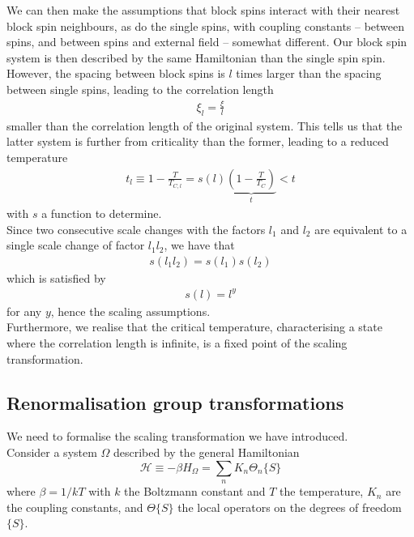 \documentclass[class=report, float=false, crop=false]{standalone}
\begin{document}
We can then make the assumptions that block spins interact with their nearest block spin neighbours, as do the single spins, with coupling constants -- between spins, and between spins and external field -- somewhat different. Our block spin system is then described by the same Hamiltonian than the single spin spin. However, the spacing between block spins is $l$ times larger than the spacing between single spins, leading to the correlation length
\begin{align*}
\xi_l = \frac{\xi}{l}
\end{align*}
smaller than the correlation length of the original system. This tells us that the latter system is further from criticality than the former, leading to a reduced temperature
\begin{align*}
t_l \equiv 1 - \frac{T}{T_{C,l}} = s(l) \underbrace{\left(1 - \frac{T}{T_C}\right)}_{t} < t
\end{align*}
with $s$ a function to determine.\\

Since two consecutive scale changes with the factors $l_1$ and $l_2$ are equivalent to a single scale change of factor $l_1l_2$, we have that
\begin{align*}
s(l_1l_2) = s(l_1)s(l_2)
\end{align*}
which is satisfied by
\begin{align*}
s(l) = l^y
\end{align*}
for any $y$, hence the scaling assumptions.\\

Furthermore, we realise that the critical temperature, characterising a state where the correlation length is infinite, is a fixed point of the scaling transformation.

\subsection{Renormalisation group transformations}

We need to formalise the scaling transformation we have introduced.\\

Consider a system $\Omega$ described by the general Hamiltonian
\begin{equation}
\mathcal{H} \equiv -\beta H_{\Omega} = \sum_n K_n \Theta_n\{S\}
\end{equation}
where $\beta = 1/kT$ with $k$ the Boltzmann constant and $T$ the temperature, $K_n$ are the coupling constants, and $\Theta\{S\}$ the local operators on the degrees of freedom $\{S\}$.\\
\end{document}

